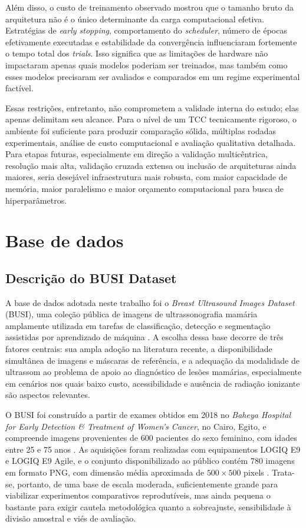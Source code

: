 \documentclass[tcc,capa]{texufpel}
\begin{document}
Além disso, o custo de treinamento observado mostrou que o tamanho bruto da arquitetura não é o único determinante da carga computacional efetiva. Estratégias de \textit{early stopping}, comportamento do \textit{scheduler}, número de épocas efetivamente executadas e estabilidade da convergência influenciaram fortemente o tempo total dos \textit{trials}. Isso significa que as limitações de hardware não impactaram apenas quais modelos poderiam ser treinados, mas também como esses modelos precisaram ser avaliados e comparados em um regime experimental factível.

Essas restrições, entretanto, não comprometem a validade interna do estudo; elas apenas delimitam seu alcance. Para o nível de um TCC tecnicamente rigoroso, o ambiente foi suficiente para produzir comparação sólida, múltiplas rodadas experimentais, análise de custo computacional e avaliação qualitativa detalhada. Para etapas futuras, especialmente em direção a validação multicêntrica, resolução mais alta, validação cruzada extensa ou inclusão de arquiteturas ainda maiores, seria desejável infraestrutura mais robusta, com maior capacidade de memória, maior paralelismo e maior orçamento computacional para busca de hiperparâmetros.

\section{Base de dados}

\subsection{Descrição do BUSI Dataset}

A base de dados adotada neste trabalho foi o \textit{Breast Ultrasound Images Dataset} (BUSI), uma coleção pública de imagens de ultrassonografia mamária amplamente utilizada em tarefas de classificação, detecção e segmentação assistidas por aprendizado de máquina \cite{AlDhabyani2020}. A escolha dessa base decorre de três fatores centrais: sua ampla adoção na literatura recente, a disponibilidade simultânea de imagens e máscaras de referência, e a adequação da modalidade de ultrassom ao problema de apoio ao diagnóstico de lesões mamárias, especialmente em cenários nos quais baixo custo, acessibilidade e ausência de radiação ionizante são aspectos relevantes.

O BUSI foi construído a partir de exames obtidos em 2018 no \textit{Baheya Hospital for Early Detection \& Treatment of Women’s Cancer}, no Cairo, Egito, e compreende imagens provenientes de 600 pacientes do sexo feminino, com idades entre 25 e 75 anos \cite{AlDhabyani2020}. As aquisições foram realizadas com equipamentos LOGIQ E9 e LOGIQ E9 Agile, e o conjunto disponibilizado ao público contém 780 imagens em formato PNG, com dimensão média aproximada de \(500 \times 500\) pixels \cite{AlDhabyani2020}. Trata-se, portanto, de uma base de escala moderada, suficientemente grande para viabilizar experimentos comparativos reprodutíveis, mas ainda pequena o bastante para exigir cautela metodológica quanto a sobreajuste, sensibilidade à divisão amostral e viés de avaliação.
\end{document}
